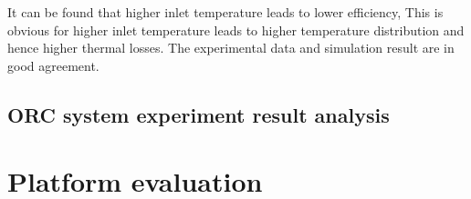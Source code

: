 It can be found that higher inlet temperature leads to lower efficiency, This is obvious for higher inlet temperature leads to higher temperature distribution and hence higher thermal losses. The experimental data and simulation result are in good agreement.

\subsection{ORC system experiment result analysis}

\section{Platform evaluation}